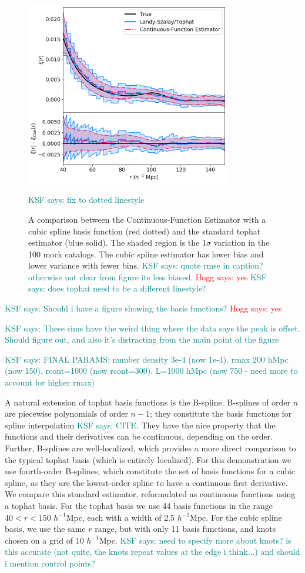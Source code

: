 \documentclass[modern]{aastex62}
\newcommand{\est}{the Continuous-Function Estimator\xspace}
\newcommand{\hmpc}{$h^{-1}$Mpc}
\newcommand{\KSF}[1]{\textcolor{teal}{KSF says: #1}}
\newcommand{\hogg}[1]{\textcolor{red}{Hogg says: #1}}
\begin{document}
\label{fig:spline}
\begin{figure}[ht]
\centering
    \includegraphics[width=0.8\textwidth]{tophat_cubic}
    \caption{A comparison between \est with a cubic spline basis function (red dotted) and the standard tophat estimator (blue solid). The shaded region is the 1$\sigma$ variation in the 100 mock catalogs. The cubic spline estimator has lower bias and lower variance with fewer bins. \KSF{quote rmse in caption? otherwise not clear from figure its less biased.} \hogg{yes} \KSF{does tophat need to be a different linestyle?}} \KSF{fix to dotted linestyle}

\end{figure}

\KSF{Should i have a figure showing the basis functions?} \hogg{yes}

\KSF{These sims have the weird thing where the data says the peak is offset. Should figure out, and also it's distracting from the main point of the figure} 

\KSF{FINAL PARAMS:  number density 3e-4 (now 1e-4). rmax 200 hMpc (now 150). rcont=1000 (now rcont=300). L=1000 hMpc (now 750 - need more to account for higher rmax)}

A natural extension of tophat basis functions is the B-spline.
B-splines of order $n$ are piecewise polynomials of order $n-1$; they constitute the basis functions for spline interpolation \KSF{CITE}.
They have the nice property that the functions and their derivatives can be continuous, depending on the order.
Further, B-splines are well-localized, which provides a more direct comparison to the typical tophat basis (which is entirely localized).
For this demonstration we use fourth-order B-splines, which constitute the set of basis functions for a cubic spline, as they are the lowest-order spline to have a continuous first derivative.
We compare this standard estimator, reformulated as continuous functions using a tophat basis.
For the tophat basis we use 44 basis functions in the range $40 < r < 150$ \hmpc, each with a width of 2.5 \hmpc. 
For the cubic spline basis, we use the same $r$ range, but with only 11 basis functions, and knots chosen on a grid of 10 \hmpc.
\KSF{need to specify more about knots? is this accurate (not quite, the knots repeat values at the edge i think...) and should i mention control points?}
\end{document}
